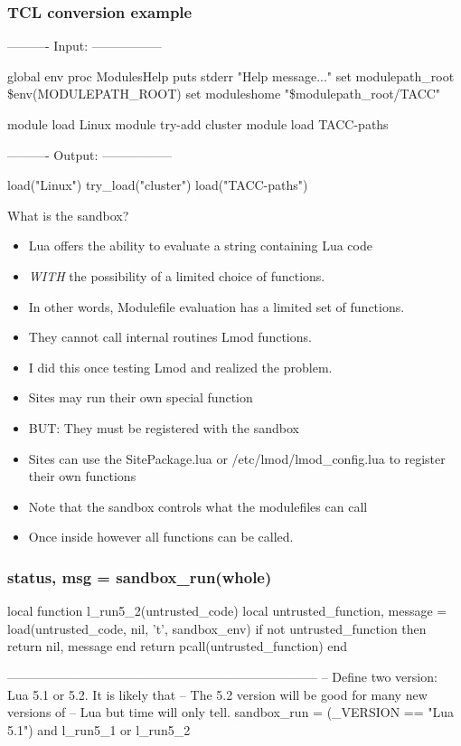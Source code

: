 \documentclass{beamer}
\begin{document}
\begin{frame}[fragile]
    \frametitle{TCL conversion example}
 {\tiny
   \begin{semiverbatim}
---------- Input: -----------------

global env
proc ModulesHelp { } {
puts stderr "Help message..."
}
set modulepath\_root  \$env(MODULEPATH\_ROOT)
set moduleshome     "\$modulepath\_root/TACC"

module load Linux
module try-add cluster
module load TACC-paths

---------- Output: -----------------

load("Linux")
try_load("cluster")
load("TACC-paths")
    \end{semiverbatim}
}
\end{frame}


\begin{frame}{What is the sandbox?}
  \begin{itemize}
    \item Lua offers the ability to evaluate a string containing Lua
      code
    \item \emph{WITH} the possibility of a limited choice of
      functions.
    \item In other words, Modulefile evaluation has a limited set of functions.
    \item They cannot call internal routines Lmod functions.
    \item I did this once testing Lmod and realized the problem.
    \item Sites may run their own special function
    \item BUT: They must be registered with the sandbox 
    \item Sites can use the SitePackage.lua or
      /etc/lmod/lmod\_config.lua to register their own functions
    \item Note that the sandbox controls what the modulefiles can call
    \item Once inside however all functions can be called.
  \end{itemize}
\end{frame}

\begin{frame}[fragile]
    \frametitle{status, msg = sandbox\_run(whole)}
 {\tiny
    \begin{semiverbatim}
local function l\_run5\_2(untrusted\_code)
  local untrusted\_function, message = load(untrusted\_code, nil, 't', sandbox\_env)
  if not untrusted\_function then return nil, message end
  return pcall(untrusted\_function)
end

--------------------------------------------------------------------------
-- Define two version: Lua 5.1 or 5.2.  It is likely that
-- The 5.2 version will be good for many new versions of
-- Lua but time will only tell.
sandbox\_run = (\_VERSION == "Lua 5.1") and l\_run5\_1 or l\_run5\_2
    \end{semiverbatim}
}
\end{frame}
\end{document}
